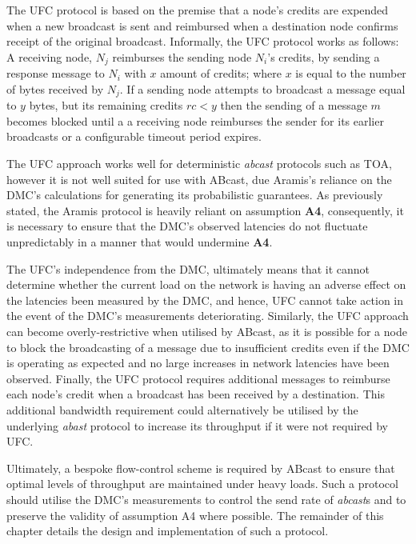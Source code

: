 The \textsf{UFC} protocol is based on the premise that a node's credits are expended when a new broadcast is sent and reimbursed when a destination node confirms receipt of the original broadcast.  Informally, the \textsf{UFC} protocol works as follows: A receiving node, $N_j$ reimburses the sending node $N_i$'s credits, by sending a response message to $N_i$ with $x$ amount of credits; where $x$ is equal to the number of bytes received by $N_j$.  If a sending node  attempts to broadcast a message equal to $y$ bytes, but its remaining credits $rc < y$ then the sending of a message $m$ becomes blocked until a a receiving node reimburses the sender for its earlier broadcasts or a configurable timeout period expires.  

The \textsf{UFC} approach works well for deterministic \emph{abcast} protocols such as TOA, however it is not well suited for use with \textsf{ABcast}, due \textsf{Aramis}'s reliance on the DMC's calculations for generating its probabilistic guarantees.  As previously stated, the \textsf{Aramis} protocol is heavily reliant on assumption \textbf{A4}, consequently, it is necessary to ensure that the DMC's observed latencies do not fluctuate unpredictably in a manner that would undermine \textbf{A4}.  

The \textsf{UFC}'s independence from the DMC, ultimately means that it cannot determine whether the current load on the network is having an adverse effect on the latencies been measured by the DMC, and hence, \textsf{UFC} cannot take action in the event of the DMC's measurements deteriorating.  Similarly, the \textsf{UFC} approach can become overly-restrictive when utilised by \textsf{ABcast}, as it is possible for a node to block the broadcasting of a message due to insufficient credits even if the DMC is operating as expected and no large increases in network latencies have been observed.  Finally, the \textsf{UFC} protocol requires additional messages to reimburse each node's credit when a broadcast has been received by a destination.  This additional bandwidth requirement could alternatively be utilised by the underlying \emph{abast} protocol to increase its throughput if it were not required by \textsf{UFC}.  

Ultimately, a bespoke flow-control scheme is required by \textsf{ABcast} to ensure that optimal levels of throughput are maintained under heavy loads.  Such a protocol should utilise the DMC's measurements to control the send rate of \emph{abcast}s and to preserve the validity of assumption A4 where possible.  The remainder of this chapter details the design and implementation of such a protocol.  

